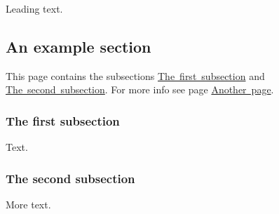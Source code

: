 Leading text. \hypertarget{page1_sec}{}\subsection{An example section}\label{page1_sec}
This page contains the subsections \mbox{\hyperlink{page1_subsection1}{The first subsection}} and \mbox{\hyperlink{page1_subsection2}{The second subsection}}. For more info see page \mbox{\hyperlink{page2}{Another page}}. \hypertarget{page1_subsection1}{}\subsubsection{The first subsection}\label{page1_subsection1}
Text. \hypertarget{page1_subsection2}{}\subsubsection{The second subsection}\label{page1_subsection2}
More text. 